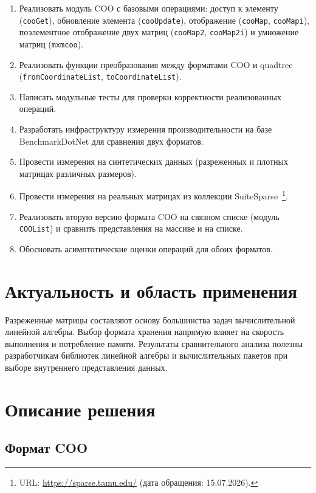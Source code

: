\documentclass[a4paper]{article}
\begin{document}
\begin{enumerate}
    \item Реализовать модуль COO с базовыми операциями: доступ к элементу (\texttt{cooGet}), обновление элемента (\texttt{cooUpdate}), отображение (\texttt{cooMap}, \texttt{cooMapi}), поэлементное отображение двух матриц (\texttt{cooMap2}, \texttt{cooMap2i}) и умножение матриц (\texttt{mxmcoo}).
    \item Реализовать функции преобразования между форматами COO и quadtree (\texttt{fromCoordinateList}, \texttt{toCoordinateList}).
    \item Написать модульные тесты для проверки корректности реализованных операций.
    \item Разработать инфраструктуру измерения производительности на базе BenchmarkDotNet для сравнения двух форматов.
    \item Провести измерения на синтетических данных (разреженных и плотных матрицах различных размеров).
    \item Провести измерения на реальных матрицах из коллекции SuiteSparse~\footnote{URL: \url{https://sparse.tamu.edu/} (дата обращения: 15.07.2026).}.
    \item Реализовать вторую версию формата COO на связном списке (модуль \texttt{COOList}) и сравнить представления на массиве и на списке.
    \item Обосновать асимптотические оценки операций для обоих форматов.
\end{enumerate}

\section{Актуальность и область применения}

Разреженные матрицы составляют основу большинства задач вычислительной линейной алгебры. Выбор формата хранения напрямую влияет на скорость выполнения и потребление памяти. Результаты сравнительного анализа полезны разработчикам библиотек линейной алгебры и вычислительных пакетов при выборе внутреннего представления данных.

\section{Описание решения}

\subsection{Формат COO}\label{subsec:coo}
\end{document}
